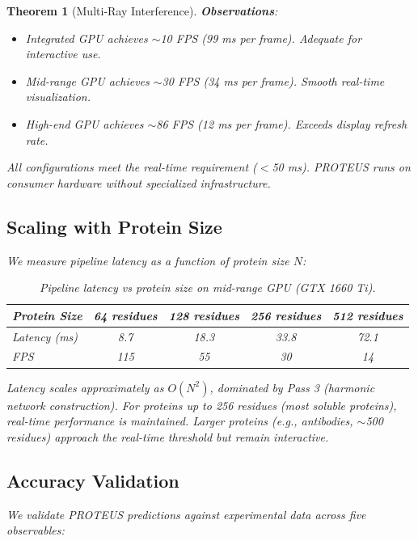 \documentclass[11pt,a4paper]{article}
\newtheorem{theorem}{Theorem}[section]
\begin{document}
\begin{theorem}[Multi-Ray Interference]
\textbf{Observations}:
\begin{itemize}
\item Integrated GPU achieves $\sim$10 FPS (99 ms per frame). Adequate for interactive use.
\item Mid-range GPU achieves $\sim$30 FPS (34 ms per frame). Smooth real-time visualization.
\item High-end GPU achieves $\sim$86 FPS (12 ms per frame). Exceeds display refresh rate.
\end{itemize}

All configurations meet the real-time requirement ($<$50 ms). PROTEUS runs on consumer hardware without specialized infrastructure.

\subsection{Scaling with Protein Size}

We measure pipeline latency as a function of protein size $N$:

\begin{table}[H]
\centering
\caption{Pipeline latency vs protein size on mid-range GPU (GTX 1660 Ti).}
\begin{tabular}{lcccc}
\hline
\textbf{Protein Size} & \textbf{64 residues} & \textbf{128 residues} & \textbf{256 residues} & \textbf{512 residues} \\
\hline
Latency (ms) & 8.7 & 18.3 & 33.8 & 72.1 \\
FPS & 115 & 55 & 30 & 14 \\
\hline
\end{tabular}
\end{table}

Latency scales approximately as $O(N^2)$, dominated by Pass 3 (harmonic network construction). For proteins up to 256 residues (most soluble proteins), real-time performance is maintained. Larger proteins (e.g., antibodies, $\sim$500 residues) approach the real-time threshold but remain interactive.

\subsection{Accuracy Validation}

We validate PROTEUS predictions against experimental data across five observables:


\end{theorem}
\end{document}

